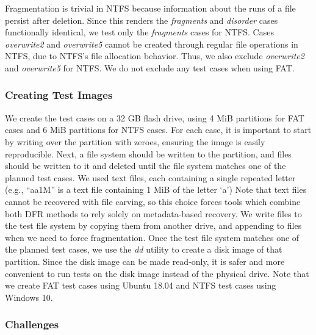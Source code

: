 Fragmentation is trivial in NTFS because information about the runs of a file persist after deletion.
Since this renders the \emph{fragments} and \emph{disorder} cases functionally identical, we test only the \emph{fragments} cases for NTFS.
Cases \emph{overwrite2} and \emph{overwrite5} cannot be created through regular file operations in NTFS, due to NTFS's file allocation behavior.
Thus, we also exclude \emph{overwrite2} and \emph{overwrite5} for NTFS.
We do not exclude any test cases when using FAT.


\subsubsection{Creating Test Images}

We create the test cases on a 32 GB flash drive, using 4 MiB partitions for FAT cases and 6 MiB partitions for NTFS cases.
For each case, it is important to start by writing over the partition with zeroes, ensuring the image is easily reproducible.
Next, a file system should be written to the partition, and files should be written to it and deleted until the file system matches one of the planned test cases.
We used text files, each containing a single repeated letter (e.g., ``aa1M'' is a text file containing 1 MiB of the letter `a')
Note that text files cannot be recovered with file carving, so this choice forces tools which combine both DFR methods to rely solely on metadata-based recovery.
We write files to the test file system by copying them from another drive, and appending to files when we need to force fragmentation.
Once the test file system matches one of the planned test cases, we use the \emph{dd} utility to create a disk image of that partition.
Since the disk image can be made read-only, it is safer and more convenient to run tests on the disk image instead of the physical drive.
Note that we create FAT test cases using Ubuntu 18.04 and NTFS test cases using Windows 10.

\subsubsection{Challenges}

